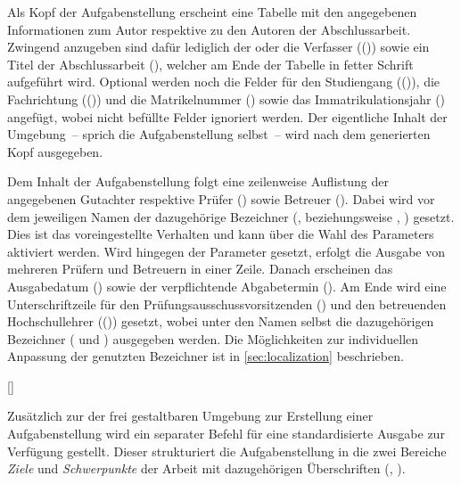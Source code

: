 \begin{DeclareEntity}{}
\begin{Declaration}
\begin{Declaration}
\begin{Declaration}
Als Kopf der Aufgabenstellung erscheint eine Tabelle mit den angegebenen 
Informationen zum Autor respektive zu den Autoren der Abschlussarbeit. Zwingend 
anzugeben sind dafür lediglich der oder die Verfasser (())
sowie ein Titel der Abschlussarbeit (), welcher am Ende der 
Tabelle in fetter Schrift aufgeführt wird. Optional werden noch die Felder für 
den Studiengang (()), die Fachrichtung (()) und 
die Matrikelnummer () sowie das Immatrikulationsjahr 
() angefügt, wobei nicht befüllte Felder ignoriert 
werden. Der eigentliche Inhalt der Umgebung~-- sprich die Aufgabenstellung 
selbst~-- wird nach dem generierten Kopf ausgegeben.

Dem Inhalt der Aufgabenstellung folgt eine zeilenweise Auflistung der 
angegebenen Gutachter respektive Prüfer () sowie Betreuer 
(). Dabei wird vor dem jeweiligen Namen der dazugehörige 
Bezeichner (,  beziehungsweise 
, ) gesetzt. 
%
Dies ist das voreingestellte Verhalten und kann über die Wahl des Parameters
 aktiviert werden. Wird hingegen der  
Parameter  gesetzt, erfolgt die Ausgabe 
von mehreren Prüfern und Betreuern in einer Zeile. Danach erscheinen das 
Ausgabedatum () sowie der verpflichtende Abgabetermin 
(). Am Ende wird eine Unterschriftzeile für den 
Prüfungsausschussvorsitzenden () und den betreuenden 
Hochschullehrer (()) gesetzt, wobei unter den Namen selbst die 
dazugehörigen Bezeichner ( und ) 
ausgegeben werden. Die Möglichkeiten zur individuellen Anpassung der 
genutzten Bezeichner ist in \autoref{sec:localization} beschrieben. 
\end{Declaration}
\end{Declaration}
\end{Declaration}

\begin{Declaration}
  {[\OList{}]}
\printdeclarationlist

Zusätzlich zur der frei gestaltbaren Umgebung  zur Erstellung
einer Aufgabenstellung wird ein separater Befehl für eine standardisierte 
Ausgabe zur Verfügung gestellt. Dieser strukturiert die Aufgabenstellung in die 
zwei Bereiche \emph{Ziele} und \emph{Schwerpunkte} der Arbeit mit dazugehörigen 
Überschriften (, ).


\end{Declaration}
\end{DeclareEntity}
